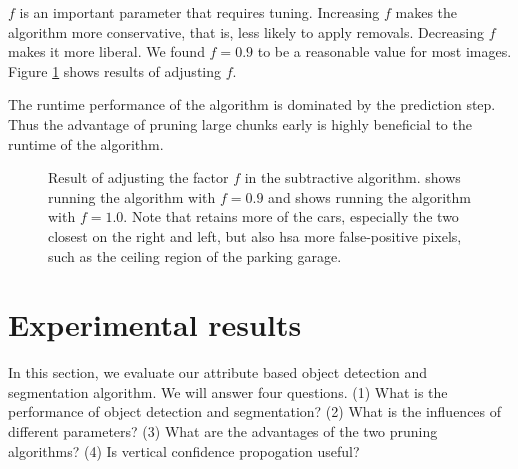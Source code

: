 \documentclass[10pt,twocolumn,letterpaper]{article}
\begin{document}
$f$ is an important parameter that requires tuning.  Increasing $f$ makes the
algorithm more conservative, that is, less likely to apply removals.  Decreasing
$f$ makes it more liberal.  We found $f=0.9$ to be a reasonable value for most images.
Figure \ref{fig:f} shows results of adjusting $f$.

The runtime performance of the algorithm is dominated by the prediction step.
Thus the advantage of pruning large chunks early is highly beneficial to 
the runtime of the algorithm.

\begin{figure}
\centering
{}
\caption{Result of adjusting the factor $f$ in the subtractive algorithm.
 shows running the algorithm with $f=0.9$ and 
shows running the algorithm with $f=1.0$.  Note that  retains
more of the cars, especially the two closest on the right and left, but also
hsa more false-positive pixels, such as the ceiling region of the parking
garage.}
\label{fig:f}
\end{figure}

\section{Experimental results}
\label{sec:results}

In this section, we evaluate our attribute based object detection and segmentation algorithm. We will answer four questions. (1) What is the performance of object detection and segmentation? (2) What is the influences of different parameters? (3) What are the advantages of the two pruning algorithms? (4) Is vertical confidence propogation useful? 
\end{document}
